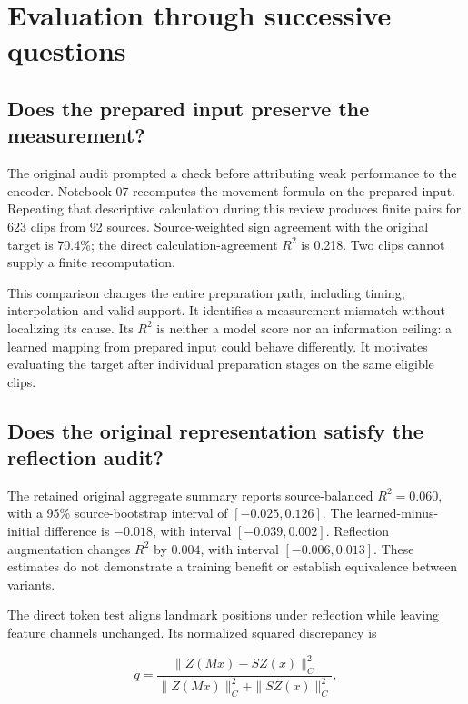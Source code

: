 \documentclass{article}
\begin{document}
\section{Evaluation through successive questions}\label{evaluation-through-successive-questions}

\subsection{Does the prepared input preserve the measurement?}\label{does-the-prepared-input-preserve-the-measurement}

The original audit prompted a check before attributing weak performance to the encoder. Notebook 07 recomputes the movement formula on the prepared input. Repeating that descriptive calculation during this review produces finite pairs for 623 clips from 92 sources. Source-weighted sign agreement with the original target is 70.4\%; the direct calculation-agreement \(R^2\) is 0.218. Two clips cannot supply a finite recomputation.

This comparison changes the entire preparation path, including timing, interpolation and valid support. It identifies a measurement mismatch without localizing its cause. Its \(R^2\) is neither a model score nor an information ceiling: a learned mapping from prepared input could behave differently. It motivates evaluating the target after individual preparation stages on the same eligible clips.

\subsection{Does the original representation satisfy the reflection audit?}\label{does-the-original-representation-satisfy-the-reflection-audit}

The retained original aggregate summary reports source-balanced \(R^2=0.060\), with a 95\% source-bootstrap interval of \([-0.025,0.126]\). The learned-minus-initial difference is \(-0.018\), with interval \([-0.039,0.002]\). Reflection augmentation changes \(R^2\) by \(0.004\), with interval \([-0.006,0.013]\). These estimates do not demonstrate a training benefit or establish equivalence between variants.

The direct token test aligns landmark positions under reflection while leaving feature channels unchanged. Its normalized squared discrepancy is

\[
q=\frac{\|Z(Mx)-SZ(x)\|_C^2}
{\|Z(Mx)\|_C^2+\|SZ(x)\|_C^2},
\]
\end{document}

